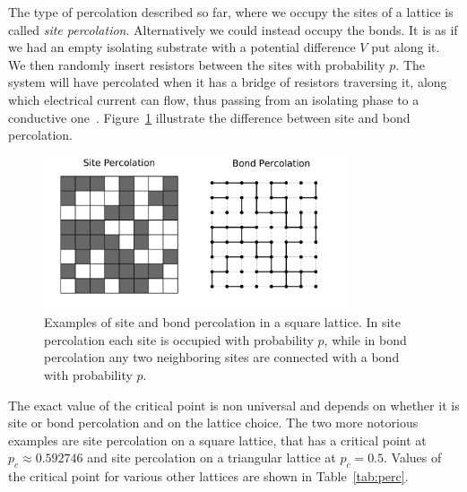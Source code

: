The type of percolation described so far, where we occupy the sites of a lattice
is called \textit{site percolation}. Alternatively we could instead occupy the
bonds. It is as if we had an empty isolating substrate with a potential
difference $V$ put along it. We then randomly insert resistors between the
sites with probability $p$. The system will have percolated when it has a
bridge of resistors traversing it, along which electrical current can flow,
thus passing from an isolating phase to a conductive one~\cite{Kirkpatrick1973}.
Figure~\ref{fig:sitebond} illustrate the difference between site and bond
percolation.

\begin{figure}[b]
\begin{center}
    \includegraphics[width=0.8\textwidth]{chapters/ch2-crit/figs/sitebond}
\end{center}
\caption{Examples of site and bond percolation in a square lattice.
    In site percolation each site is occupied with probability $p$, while
    in bond percolation any two neighboring sites are connected with a bond
    with probability $p$.}
\label{fig:sitebond}
\end{figure}

The exact value of the critical point is non universal and depends on whether
it is site or bond percolation and on the lattice choice. The two more notorious
examples are site percolation on a square lattice, that has a critical point at
$p_c\approx0.592746$ and site percolation on a triangular lattice at $p_c=0.5$.
Values of the critical point for various other lattices are shown in
Table~\ref{tab:perc}.

